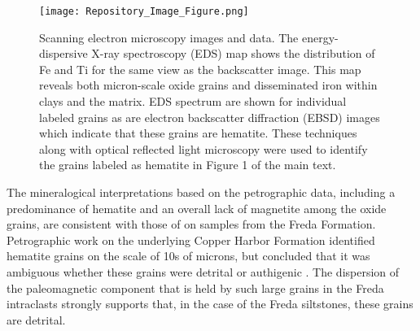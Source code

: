 \documentclass[11pt,letterpaper]{article}
\begin{document}
\begin{figure}[!ht]
\centering
\noindent\texttt{[image: Repository\_Image\_Figure.png]}
\caption{\small{Scanning electron microscopy images and data. The energy-dispersive X-ray spectroscopy (EDS) map shows the distribution of Fe and Ti for the same view as the backscatter image. This map reveals both micron-scale oxide grains and disseminated iron within clays and the matrix. EDS spectrum are shown for individual labeled grains as are electron backscatter diffraction (EBSD) images which indicate that these grains are hematite. These techniques along with optical reflected light microscopy were used to identify the grains labeled as hematite in Figure 1 of the main text.}}
\label{fig:sem_images}
\end{figure} 

The mineralogical interpretations based on the petrographic data, including a predominance of hematite and an overall lack of magnetite among the oxide grains, are consistent with those of \cite{Vincenz1968b} on samples from the Freda Formation. Petrographic work on the underlying Copper Harbor Formation identified hematite grains on the scale of 10s of microns, but concluded that it was ambiguous whether these grains were detrital or authigenic \citep{Elmore1982a}. The dispersion of the paleomagnetic component that is held by such large grains in the Freda intraclasts strongly supports that, in the case of the Freda siltstones, these grains are detrital.



\end{document}
